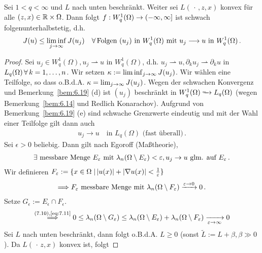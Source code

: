\begin{satz}\label{satz:7.27}
Sei $1 < q < \infty$ und $L$ nach unten beschränkt. Weiter sei $L(\, \cdot \, , z, x)$ konvex für alle $(z,x) \in \mathbb{R} \times \Omega$. Dann folgt $f: W^1_q(\Omega) \rightarrow (-\infty, \infty]$ ist schwach folgenunterhalbstetig, d.h.
\[
	J(u) \leq \liminf_{j \rightarrow \infty} J(u_j) \quad \forall \, \text{Folgen } (u_j) \text{ in } W^1_q(\Omega) \text{ mit } u_j \longrightarrow u \text{ in } W^1_q(\Omega) \, .
\]
\end{satz}

\begin{proof}
Sei $u_j \in W^1_q (\Omega), u_j \rightharpoonup u$ in $W^1_q (\Omega)$, d.h. $u_j \rightharpoonup u, \partial_k u_j \rightharpoonup \partial_k u$ in $L_q(\Omega) \, \forall \, k = 1, \ldots, n$. Wir setzen $\kappa := \liminf_{j\rightarrow \infty} J(u_j)$. Wir wählen eine Teilfolge, so dass o.B.d.A. $\kappa = \lim_{j\rightarrow \infty} J(u_j)$. Wegen der schwachen Konvergenz und Bemerkung~\ref{bem:6.19} (d) ist $(u_j)$ beschränkt in $W^1_q(\Omega) \hhookrightarrow L_q(\Omega)$ (wegen Bemerkung~\ref{bem:6.14} und Redlich Konarachov). Aufgrund von Bemerkung~\ref{bem:6.19} (e) sind schwache Grenzwerte eindeutig und mit der Wahl einer Teilfolge gilt dann auch
\begin{align}
\label{eq:7.9}
u_j \longrightarrow u \quad \text{in } L_q(\Omega) \text{ (fast überall)} \, .
\end{align}
Sei $\epsilon > 0$ beliebig. Dann gilt nach Egoroff (Maßtheorie), 
\begin{align}\label{eq:here}\exists \text{ messbare Menge } E_\varepsilon \text{ mit }\lambda_n (\Omega\setminus E_\varepsilon) < \varepsilon, u_j \rightarrow u\text{ glm. auf }E_\varepsilon\, . \end{align}
Wir definieren $F_\varepsilon := \{ x \in \Omega \;\vert\, \lvert u(x)\rvert + \lvert \nabla u(x)\rvert < \frac 1{\varepsilon}\}$
\begin{align}
\label{eq:7.11}
\Longrightarrow F_\varepsilon \text{ messbare Menge mit } \lambda_n(\Omega \setminus F_\varepsilon) \xrightarrow{\varepsilon \rightarrow 0} 0 \, .
\end{align}
Setze $G_\epsilon := E_\epsilon \cap F_\epsilon$.
\begin{align}
\label{eq:7.12}
\stackrel{\scriptsize(7.10), \eqref{eq:7.11}}{\Longrightarrow} 0 \leq \lambda_n(\Omega \setminus G_\varepsilon) \leq \lambda_n(\Omega \setminus E_\varepsilon) + \lambda_n (\Omega \setminus F_\varepsilon) \xrightarrow[\varepsilon \rightarrow \infty]{} 0
\end{align}
Sei $L$ nach unten beschränkt, dann folgt o.B.d.A. $L\geq 0$ (sonst $\tilde L := L+\beta , \beta \gg0$). Da $L(\, \cdot \, z,x)$ konvex ist, folgt

\end{proof}

